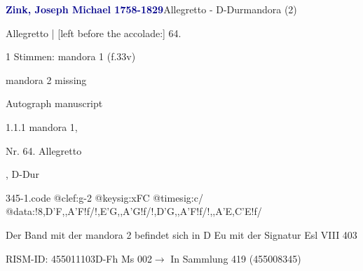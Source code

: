 \documentclass[twocolumn]{book}
\begin{document}
\par \vspace{7pt} \textcolor{darkblue}{\textbf{Zink, Joseph Michael  1758-1829}}\hfillplus{\textbf{[345]}}\newline Allegretto - D-Dur\newline mandora (2)
\par \begin{itshape}[f.33v, at left:] Allegretto | [left before the accolade:] 64.\end{itshape} 
\par \textcolor{darkblue}{}  1 Stimmen: mandora 1  (f.33v)\newline \begin{small} mandora 2 missing\end{small} \newline Autograph manuscript
\par 1.1.1  mandora 1, \begin{itshape}Nr. 64. Allegretto\end{itshape}, D-Dur  
\begin{filecontents*}{345-1.code}
@clef:g-2
@keysig:xFC
@timesig:c/
@data:!{8,D'F,,A'F}!f/!{,E'G,,A'G}!f/!{,D'G,,A'F}!f/!{,,A'E,C'E}!f/
\end{filecontents*}
\newline
%
\par Der Band mit der mandora 2 befindet sich in D Eu mit der Signatur Esl VIII 403
\par RISM-ID: 455011103\newline D-Fh  Ms 002\newline $\rightarrow$ In Sammlung 419 (455008345)
      
\end{document}
